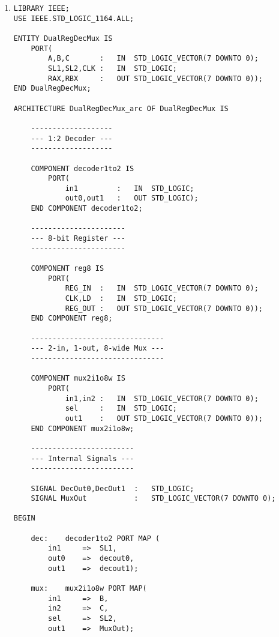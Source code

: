 \begin{enumerate}
\begin{lstlisting}
	mux1:	mux2i1o8w PORT MAP(
		in1		=>	X,
		in2		=>	Y,
		sel		=>	S1,
		out1	=>	Mux1Out);

	mux2:	mux2i1o8w PORT MAP(
		in1		=>	X,
		in2		=>	RegBOut,
		sel		=>	S0,
		out1	=>	Mux2Out);

	regA:	reg8 PORT MAP(
		REG_IN	=>	Mux2Out,
		CLK		=>	CLK,
		LD		=>	And2Out,
		REG_OUT	=>	RegAOut);

	regB:	reg8 PORT MAP(
		REG_IN	=>	Mux1Out,
		CLK		=>	CLK,
		LD		=>	And1Out,
		REG_OUT	=>	RegBOut);

	RA	<=	RegAOut;
	RB	<=	RegBOut;

END DualMuxDualReg_arc;
	\end{lstlisting}

	\item \begin{lstlisting}
LIBRARY IEEE;
USE IEEE.STD_LOGIC_1164.ALL;

ENTITY DualRegDecMux IS
	PORT(
		A,B,C		:	IN	STD_LOGIC_VECTOR(7 DOWNTO 0);
		SL1,SL2,CLK	:	IN	STD_LOGIC;
		RAX,RBX		:	OUT	STD_LOGIC_VECTOR(7 DOWNTO 0));
END DualRegDecMux;

ARCHITECTURE DualRegDecMux_arc OF DualRegDecMux IS

	-------------------
	--- 1:2 Decoder ---
	-------------------

	COMPONENT decoder1to2 IS
		PORT(
			in1			:	IN	STD_LOGIC;
			out0,out1	:	OUT	STD_LOGIC);
	END COMPONENT decoder1to2;

	----------------------
	--- 8-bit Register ---
	----------------------

	COMPONENT reg8 IS
		PORT(
			REG_IN	:	IN	STD_LOGIC_VECTOR(7 DOWNTO 0);
			CLK,LD	:	IN	STD_LOGIC;
			REG_OUT	:	OUT	STD_LOGIC_VECTOR(7 DOWNTO 0));
	END COMPONENT reg8;

	-------------------------------
	--- 2-in, 1-out, 8-wide Mux ---
	-------------------------------

	COMPONENT mux2i1o8w IS
		PORT(
			in1,in2	:	IN	STD_LOGIC_VECTOR(7 DOWNTO 0);
			sel		:	IN	STD_LOGIC;
			out1	:	OUT	STD_LOGIC_VECTOR(7 DOWNTO 0));
	END COMPONENT mux2i1o8w;

	------------------------
	--- Internal Signals ---
	------------------------

	SIGNAL DecOut0,DecOut1	:	STD_LOGIC;
	SIGNAL MuxOut			:	STD_LOGIC_VECTOR(7 DOWNTO 0);

BEGIN

	dec:	decoder1to2 PORT MAP (
		in1		=>	SL1,
		out0	=>	decout0,
		out1	=>	decout1);

	mux:	mux2i1o8w PORT MAP(
		in1		=>	B,
		in2		=>	C,
		sel		=>	SL2,
		out1	=>	MuxOut);


\end{lstlisting}
\end{enumerate}

